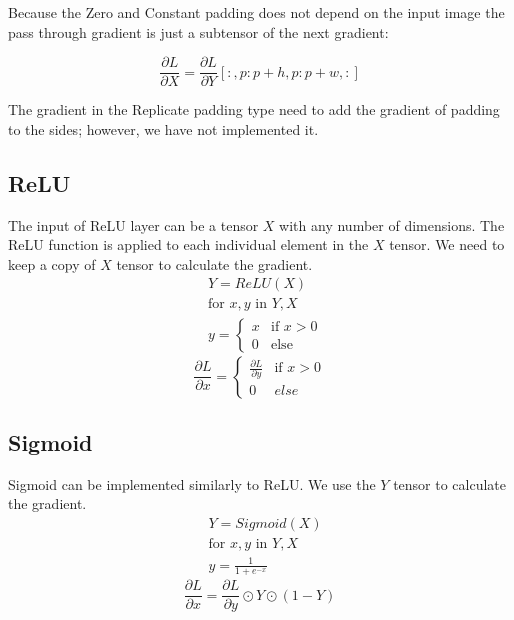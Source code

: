 \documentclass[conference]{IEEEtran}
\begin{document}
Because the Zero and Constant padding does not depend on the input image the pass through gradient is just a subtensor of the next gradient:

\begin{equation}
\frac{\partial L}{\partial X} = \frac{\partial L}{\partial Y}[:, p:p+h, p:p+w, :]
\end{equation}

The gradient in the Replicate padding type need to add the gradient of padding to the sides; however, we have not implemented it. 

\subsection{ReLU}
The input of ReLU layer can be a tensor \(X\) with any number of dimensions. The ReLU function is applied to each individual element in the \(X\) tensor.
We need to keep a copy of \(X\) tensor to calculate the gradient.
\begin{equation}
\begin{split}
&Y = ReLU(X) \\
&\text{for } x, y \text{ in } Y, X \\
&y = 
\begin{cases}
    x & \text{if } x > 0 \\
    0 & \text{else}
\end{cases}
\end{split}
\end{equation}
\begin{equation}
\frac{\partial L}{\partial x} = 
\begin{cases}
    \frac{\partial L}{\partial y} & \text{if } x > 0 \\
    0  & else
\end{cases}
\end{equation}

\subsection{Sigmoid}
Sigmoid can be implemented similarly to ReLU. We use the \(Y\) tensor to calculate the gradient.
\begin{equation}
\begin{split}
&Y = Sigmoid(X) \\
&\text{for } x, y \text{ in } Y, X \\
&y = \frac{1}{1 + e^{-x}}
\end{split}
\end{equation}
\begin{equation}
\frac{\partial L}{\partial x} = 
\frac{\partial L}{\partial y} \odot Y \odot (1 - Y)
\end{equation}
\end{document}
